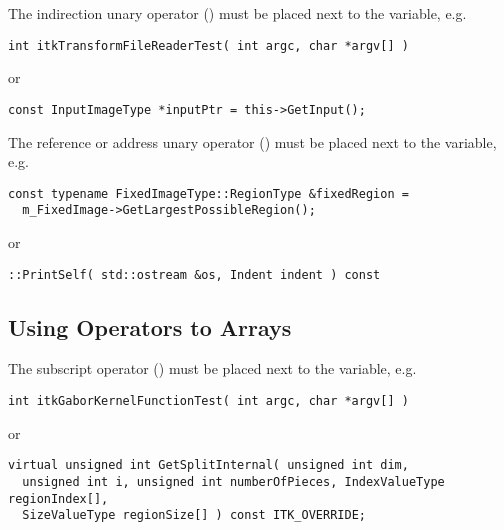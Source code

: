 The indirection unary operator (\code{*}) must be placed next to the variable, e.g.

\small
\begin{verbatim}
int itkTransformFileReaderTest( int argc, char *argv[] )
\end{verbatim}
\normalsize

or

\small
\begin{verbatim}
const InputImageType *inputPtr = this->GetInput();
\end{verbatim}
\normalsize

The reference or address unary operator (\code{\&}) must be placed next to the
variable, e.g.

\small
\begin{verbatim}
const typename FixedImageType::RegionType &fixedRegion =
  m_FixedImage->GetLargestPossibleRegion();
\end{verbatim}
\normalsize

or

\small
\begin{verbatim}
::PrintSelf( std::ostream &os, Indent indent ) const
\end{verbatim}
\normalsize


\subsection{Using Operators to Arrays}
\label{subsec:UsingOperatorsToArrays}

The subscript operator (\code{[]}) must be placed next to the variable, e.g.
\small
\begin{verbatim}
int itkGaborKernelFunctionTest( int argc, char *argv[] )
\end{verbatim}
\normalsize

or

\small
\begin{verbatim}
virtual unsigned int GetSplitInternal( unsigned int dim,
  unsigned int i, unsigned int numberOfPieces, IndexValueType regionIndex[],
  SizeValueType regionSize[] ) const ITK_OVERRIDE;
\end{verbatim}
\normalsize


